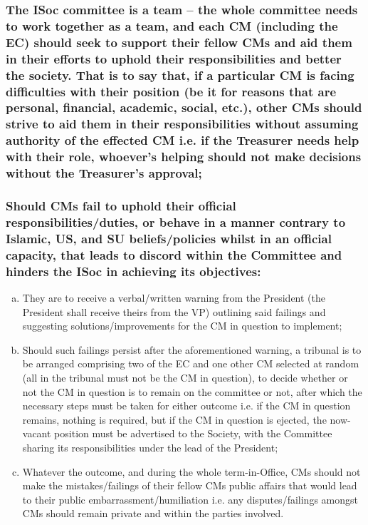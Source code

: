 \documentclass[12pt]{article}
\begin{document}
\subsubsection{The ISoc committee is a team -- the whole committee needs to work together as a team, and each CM (including the EC) should seek to support their fellow CMs and aid them in their efforts to uphold their responsibilities and better the society. That is to say that, if a particular CM is facing difficulties with their position (be it for reasons that are personal, financial, academic, social, etc.), other CMs should strive to aid them in their responsibilities without assuming authority of the effected CM i.e. if the Treasurer needs help with their role, whoever's helping should not make decisions without the Treasurer's approval;}
\subsubsection{Should CMs fail to uphold their official responsibilities/duties, or behave in a manner contrary to Islamic, US, and SU beliefs/policies whilst in an official capacity, that leads to discord within the Committee and hinders the ISoc in achieving its objectives:}
\begin{displayquote}
\begin{enumerate}[a.]
\item They are to receive a verbal/written warning from the President (the President shall receive theirs from the VP) outlining said failings and suggesting solutions/improvements for the CM in question to implement;
\item Should such failings persist after the aforementioned warning, a tribunal is to be arranged comprising two of the EC and one other CM selected at random (all in the tribunal must not be the CM in question), to decide whether or not the CM in question is to remain on the committee or not, after which the necessary steps must be taken for either outcome i.e. if the CM in question remains, nothing is required, but if the CM in question is ejected, the now-vacant position must be advertised to the Society, with the Committee sharing its responsibilities under the lead of the President;
\item Whatever the outcome, and during the whole term-in-Office, CMs should not make the mistakes/failings of their fellow CMs public affairs that would lead to their public embarrassment/humiliation i.e. any disputes/failings amongst CMs should remain private and within the parties involved.
\end{enumerate}
\end{displayquote}
\end{document}
